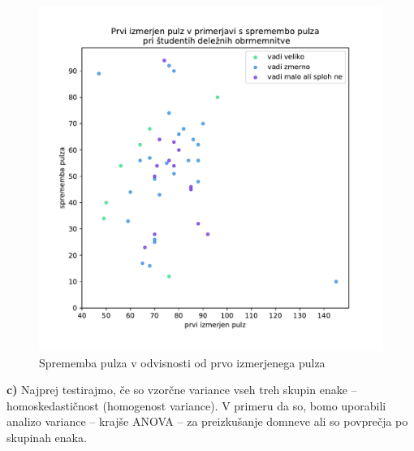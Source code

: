 \documentclass[a4paper,11pt]{article}
\begin{document}
\begin{figure}[h]
    \begin{center}
        \includegraphics[scale=0.65]{pulz_vadba.pdf}
        \caption{
            Sprememba pulza v odvisnosti od prvo izmerjenega pulza
            }
        \label{Sprememba pulza v odvisnosti od prvo izmerjenega pulza}
    \end{center}
\end{figure}

\noindent
\textbf{c)} Najprej testirajmo, če so vzorčne variance vseh treh skupin enake -- homoskedastičnost (homogenost variance). V primeru da so, bomo uporabili analizo variance -- krajše ANOVA -- za preizkušanje domneve ali so povprečja po skupinah enaka. 
\newline
\end{document}
